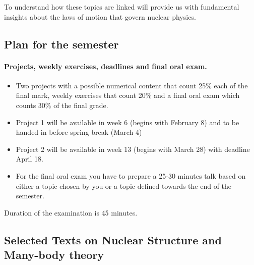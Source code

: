 \documentclass[%
oneside,                 %
final,                   %
10pt]{article}
\begin{document}
\noindent
To understand how these topics are linked will provide us with fundamental insights about the laws of motion that govern nuclear physics.




\subsection{Plan for the semester}

\paragraph{Projects, weekly exercises, deadlines and final oral exam.}
\begin{itemize}
\item Two  projects with a possible numerical content that count 25\% each of the final mark, weekly exercises  that count 20\% and a final oral exam which counts 30\% of the final grade. 

\item Project 1 will be available in week 6 (begins with February 8) and to be handed in before spring break (March 4)

\item Project 2 will be available in week 13 (begins with March 28) with deadline April 18.

\item For the final oral exam you have to prepare a 25-30 minutes talk based on either a topic chosen by you or a topic defined towards the end of the semester.
\end{itemize}

\noindent
Duration of the examination is 45 minutes.




\subsection{Selected Texts on Nuclear Structure and Many-body theory}

\end{document}
